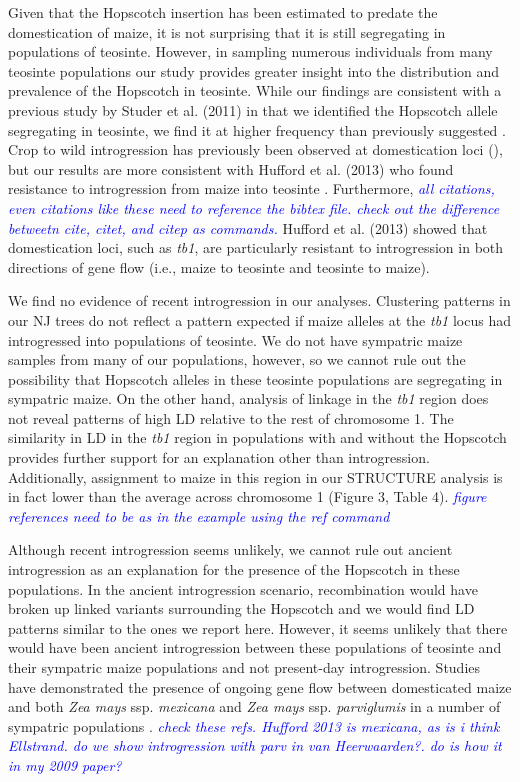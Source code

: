 \documentclass[12pt]{article}
\newcommand{\jri}[1]{\textcolor{blue}{ \emph{\scriptsize  #1}} }
\begin{document}
Given that the Hopscotch insertion has been estimated to predate the domestication of maize, it is not surprising that it is still segregating in populations of teosinte. However, in sampling numerous individuals from many teosinte populations our study provides greater insight into the distribution and prevalence of the Hopscotch in teosinte. While our findings are consistent with a previous study by Studer et al. (2011) in that we identified the Hopscotch allele segregating in teosinte, we find it at higher frequency than previously suggested \cite{Studer et al 2011}. Crop to wild introgression has previously been observed at domestication loci (\cite{Ellstrand et al 1999, Zhang et al 2009, Thurber et al 2010, Baack et al 2008, Hubner et al 2012, Wilkes et al 1977, Van Heerwaarden et al 2011, Barrett 1983}), but our results are more consistent with Hufford et al. (2013) who found resistance to introgression from maize into teosinte \cite{Hufford et al 2013}. Furthermore, \jri{all citations, even citations like these need to reference the bibtex file. check out the difference betweetn cite, citet, and citep as commands.} Hufford et al. (2013) showed that domestication loci, such as \emph{tb1}, are particularly resistant to introgression in both directions of gene flow (i.e., maize to teosinte and teosinte to maize). 

We find no evidence of recent introgression in our analyses. Clustering patterns in our NJ trees do not reflect a pattern expected if maize alleles at the \emph{tb1} locus had introgressed into populations of teosinte. We do not have sympatric maize samples from many of our populations, however, so we cannot rule out the possibility that Hopscotch alleles in these teosinte populations are segregating in sympatric maize. On the other hand, analysis of linkage in the \emph{tb1} region does not reveal patterns of high LD relative to the rest of chromosome 1. The similarity in LD in the \emph{tb1} region in populations with and without the Hopscotch provides further support for an explanation other than introgression. Additionally, assignment to maize in this region in our STRUCTURE analysis is in fact lower than the average across chromosome 1 (Figure 3, Table 4). \jri{figure references need to be as in the example using the ref command}

Although recent introgression seems unlikely, we cannot rule out ancient introgression as an explanation for the presence of the Hopscotch in these populations. In the ancient introgression scenario, recombination would have broken up linked variants surrounding the Hopscotch and we would find LD patterns similar to the ones we report here. However, it seems unlikely that there would have been ancient introgression between these populations of teosinte and their sympatric maize populations and not present-day introgression. Studies have demonstrated the presence of ongoing gene flow between domesticated maize and both \emph{Zea mays} ssp. \emph{mexicana} and \emph{Zea mays} ssp. \emph{parviglumis} in a number of sympatric populations \cite{Hufford et al 2013, Ellstrand et al 2007, van Heerwaarden et al 2011}. \jri{check these refs. Hufford 2013 is mexicana, as is i think Ellstrand. do we show introgression with parv in van Heerwaarden?. do is how it in my 2009 paper?}
\end{document}
